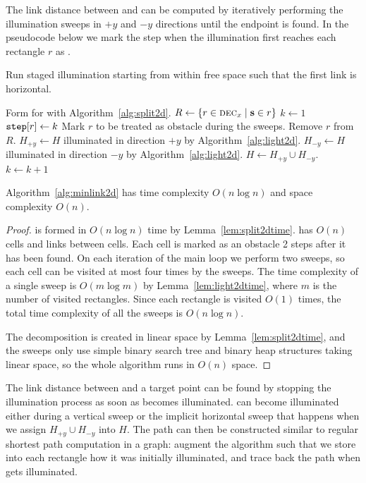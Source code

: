 \documentclass[english,gradu]{tktltiki2018}
\begin{document}
The link distance between \spt and \ept can be computed by iteratively performing the illumination sweeps in $+y$ and $-y$ directions until the endpoint is found.
In the pseudocode below we mark the step when the illumination first reaches each rectangle $r$ as .

\begin{alg}\label{alg:minlink2d}
Run staged illumination starting from \spt within free space \fspace such that the first link is horizontal.
\begin{algorithmic}
\State Form  for \fspace with Algorithm~\ref{alg:split2d}.
\State $R\gets\left\{r\in\textsc{dec}_{x} \mid \textbf{s}\in r\right\}$
\State $k\gets 1$
			\State $\texttt{step}{[r]}\gets k$
			\State Mark $r$ to be treated as obstacle during the sweeps.
			\State Remove $r$ from $R$.
		\EndIf
	\EndFor
	\State $H_{+y}\gets H$ illuminated in direction $+y$ by Algorithm~\ref{alg:light2d}.
	\State $H_{-y}\gets H$ illuminated in direction $-y$ by Algorithm~\ref{alg:light2d}.
	\State $H\gets H_{+y}\cup H_{-y}$.
	\State $k\gets k+1$
\EndWhile
\end{algorithmic}
\end{alg}

\begin{theo}Algorithm~\ref{alg:minlink2d} has time complexity $O(n\log n)$ and space complexity $O(n)$.\end{theo}
\begin{proof}
 is formed in $O(n\log n)$ time by Lemma~\ref{lem:split2dtime}.
 has $O(n)$ cells and links between cells.
Each cell is marked as an obstacle 2 steps after it has been found.
On each iteration of the main loop we perform two sweeps, so each cell can be visited at most four times by the sweeps.
The time complexity of a single sweep is $O(m\log m)$ by Lemma~\ref{lem:light2dtime}, where $m$ is the number of visited rectangles.
Since each rectangle is visited $O(1)$ times, the total time complexity of all the sweeps is $O(n\log n)$.

The decomposition is created in linear space by Lemma~\ref{lem:split2dtime}, and the sweeps only use simple binary search tree and binary heap structures taking linear space, so the whole algorithm runs in $O(n)$ space.
\end{proof}

The link distance between \spt and a target point \ept can be found by stopping the illumination process as soon as \ept becomes illuminated.
\epts can become illuminated either during a vertical sweep or the implicit horizontal sweep that happens when we assign $H_{+y}\cup H_{-y}$ into $H$.
The path can then be constructed similar to regular shortest path computation in a graph:
augment the algorithm such that we store into each rectangle how it was initially illuminated, and trace back the path when \ept gets illuminated.
\end{document}
